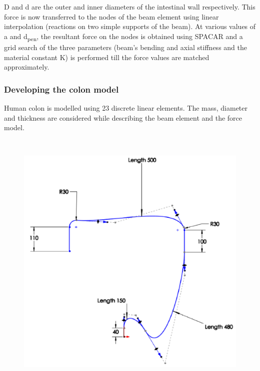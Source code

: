 \documentclass[12pt]{report}
\begin{document}
D and d are the outer and inner diameters of the intestinal wall respectively. This force is now transferred to the nodes of the beam element using linear interpolation (reactions on two simple supports of the beam). At various values of a and d\textsubscript{pen}, the resultant force on the nodes is obtained using SPACAR and a grid search of the three parameters (beam’s bending and axial stiffness and the material constant K) is performed till the force values are matched approximately.\par

\subsubsection*{Developing the colon model }
Human colon is modelled using 23 discrete linear elements. The mass, diameter and thickness are considered while describing the beam element and the force model.\par




\begin{figure}[H]
	\begin{Center}
		\includegraphics[width=5.09in,height=5.07in]{./media/image10.png}
	\end{Center}
\end{figure}
\end{document}
